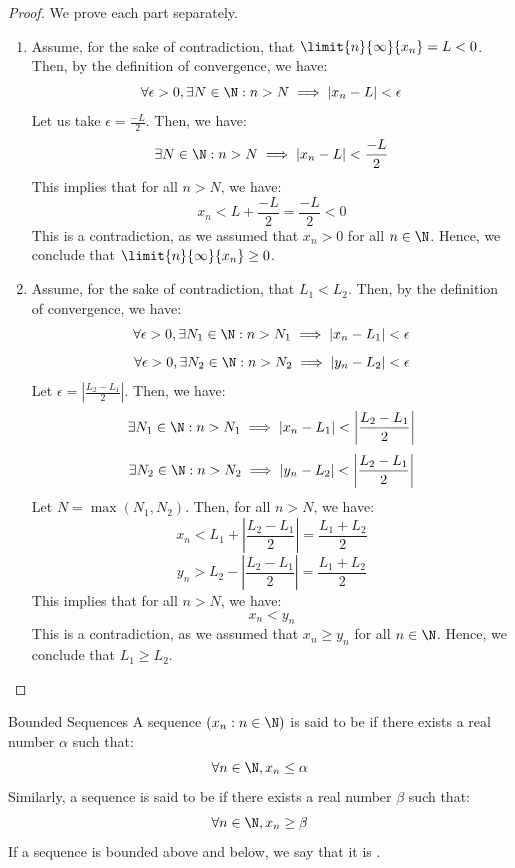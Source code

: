 \documentclass[openany]{book}
\begin{document}
\begin{proof}
    We prove each part separately. \\
    \begin{enumerate}
        \item Assume, for the sake of contradiction, that $\limit{n}{\infty}{x_n} = L < 0$. Then, by the definition of convergence, we have:
        $$\forall \epsilon > 0, \exists N \in \N: n > N \implies |x_n - L| < \epsilon$$
        Let us take $\epsilon = \frac{-L}{2}$. Then, we have:
        $$\exists N \in \N: n > N \implies |x_n - L| < \frac{-L}{2}$$
        This implies that for all $n > N$, we have:
        $$x_n < L + \frac{-L}{2} = \frac{-L}{2} < 0$$
        This is a contradiction, as we assumed that $x_n > 0$ for all $n \in \N$. Hence, we conclude that $\limit{n}{\infty}{x_n} \geq 0$.
        \item Assume, for the sake of contradiction, that $L_1 < L_2$. Then, by the definition of convergence, we have:
        $$\forall \epsilon > 0, \exists N_1 \in \N: n > N_1 \implies |x_n - L_1| < \epsilon$$
        $$\forall \epsilon > 0, \exists N_2 \in \N: n > N_2 \implies |y_n - L_2| < \epsilon$$
        Let $\epsilon = \left|\frac{L_2 - L_1}{2}\right|$. Then, we have:
        $$\exists N_1 \in \N: n > N_1 \implies |x_n - L_1| < \left|\frac{L_2 - L_1}{2}\right|$$
        $$\exists N_2 \in \N: n > N_2 \implies |y_n - L_2| < \left|\frac{L_2 - L_1}{2}\right|$$
        Let $N = \max(N_1, N_2)$. Then, for all $n > N$, we have:
        $$x_n < L_1 + \left|\frac{L_2 - L_1}{2}\right| = \frac{L_1 + L_2}{2}$$
        $$y_n > L_2 - \left|\frac{L_2 - L_1}{2}\right| = \frac{L_1 + L_2}{2}$$
        This implies that for all $n > N$, we have:
        $$x_n < y_n$$
        This is a contradiction, as we assumed that $x_n \geq y_n$ for all $n \in \N$. Hence, we conclude that $L_1 \geq L_2$.
    \end{enumerate}
\end{proof}
\begin{mydefinition}{Bounded Sequences}
    A sequence $(x_n : n \in \N)$ is said to be  if there exists a real number $\alpha$ such that:
    $$\forall n \in \N, x_n \leq \alpha$$
    Similarly, a sequence is said to be  if there exists a real number $\beta$ such that:
    $$\forall n \in \N, x_n \geq \beta$$
    If a sequence is bounded above and below, we say that it is .
\end{mydefinition}
\end{document}
